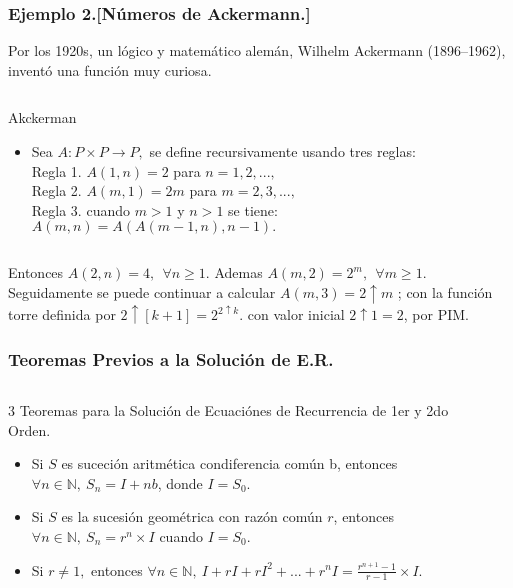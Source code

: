 \documentclass[12pt]{beamer}
\newcommand{\ds}{\displaystyle}
\begin{document}
\begin{frame}
\frametitle{Ejemplo 2.[Números de Ackermann.]}
Por los 1920s, un lógico y matemático alemán, Wilhelm Ackermann
(1896–1962), inventó una función muy curiosa.
\begin{columns}
 \begin{column}{\textwidth}
\begin{block}{Akckerman}
\begin{itemize}[<+->]
\item Sea $A: P \times P \rightarrow P,$ se define recursivamente usando tres reglas:\\
Regla 1.\hspace*{0.2cm} $\ds A(1,n)=2$ \hspace*{0.3cm} para $n = 1,2,...,$\\
Regla 2.\hspace*{0.2cm} $\ds A(m,1)=2m$ \hspace*{0.3cm} para $m =2,3,...,$\\
Regla 3.\hspace*{0.2cm} cuando $m>1$ y $n>1$ se tiene: $\ds A(m,n) = A(A(m-1,n),n-1).$

\end{itemize}
\end{block}
 \end{column} \ \
\end{columns} 
Entonces $A(2,n) = 4, ~~\forall n \geq 1.$ Ademas $A(m,2) = 2 ^{m},~~ \forall m \geq 1.$ Seguidamente se puede continuar a calcular $A(m,3) = 2 \uparrow m$ ; con la función torre definida por $2\uparrow[k+1] = 2^{2 \uparrow k}. $ con valor inicial $2 \uparrow 1 = 2$, por PIM.
\end{frame}

\begin{frame}
\frametitle{Teoremas Previos a la Solución de E.R.}
\begin{columns}
 \begin{column}{\textwidth}
\begin{block}{3 Teoremas para la Solución de Ecuaciónes de Recurrencia de 1er y 2do Orden.}
\begin{itemize}
\item Si $S$ es suceción aritmética condiferencia común b, entonces $\forall n \in \mathbb{N},~S_{n} = I + nb$, donde $I = S_{0}.$
\item Si $S$ es la sucesión geométrica con razón común $r$, entonces $\forall n \in \mathbb{N},~ S_{n} = r^{n} \times I$ cuando $I = S_{0}.$
\item Si $r \neq 1,$ entonces $\forall n \in \mathbb{N},~ I + rI + rI^{2}+...+r^{n}I = \ds\frac{r^{n+1}-1}{r-1} \times I.$ 
\end{itemize}
\end{block}
 \end{column} \ \
\end{columns} 
\end{frame}
\end{document}
